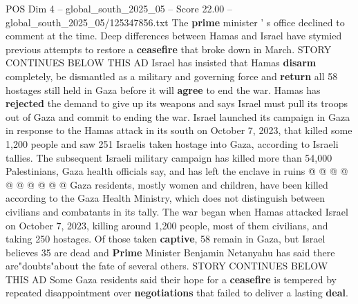 \begin{textsample}{POS Dim 4 – global\_south\_2025\_05 – Score 22.00 – global\_south\_2025\_05/125347856.txt}
The \textbf{prime} minister ' s office declined to comment at the time.
Deep differences between Hamas and Israel have stymied previous attempts to restore a \textbf{ceasefire} that broke down in March.
STORY CONTINUES BELOW THIS AD Israel has insisted that Hamas \textbf{disarm} completely, be dismantled as a military and governing force and \textbf{return} all 58 hostages still held in Gaza before it will \textbf{agree} to end the war.
Hamas has \textbf{rejected} the demand to give up its weapons and says Israel must pull its troops out of Gaza and commit to ending the war.
Israel launched its campaign in Gaza in response to the Hamas attack in its south on October 7, 2023, that killed some 1,200 people and saw 251 Israelis taken hostage into Gaza, according to Israeli tallies.
The subsequent Israeli military campaign has killed more than 54,000 Palestinians, Gaza health officials say, and has left the enclave in ruins @ @ @ @ @ @ @ @ @ @ Gaza residents, mostly women and children, have been killed according to the Gaza Health Ministry, which does not distinguish between civilians and combatants in its tally.
The war began when Hamas attacked Israel on October 7, 2023, killing around 1,200 people, most of them civilians, and taking 250 hostages.
Of those taken \textbf{captive}, 58 remain in Gaza, but Israel believes 35 are dead and \textbf{Prime} Minister Benjamin Netanyahu has said there are"doubts"about the fate of several others.
STORY CONTINUES BELOW THIS AD Some Gaza residents said their hope for a \textbf{ceasefire} is tempered by repeated disappointment over \textbf{negotiations} that failed to deliver a lasting \textbf{deal}.

\end{textsample}
